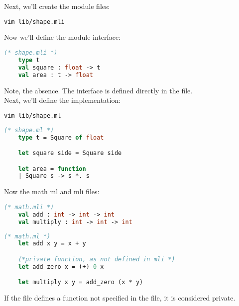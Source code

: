 \newpage 

\begin{Example}

  Next, we'll create the module files:
  \begin{lstlisting}[language=OCaml, numbers=none]
    vim lib/shape.mli 
  \end{lstlisting}

  \noindent
  Now we'll define the module interface:
  \begin{lstlisting}[language=OCaml, numbers=none]
    (* shape.mli *)
    type t
    val square : float -> t
    val area : t -> float
  \end{lstlisting}
  \noindent 
  Note, the  absence. The interface is defined directly in the  file.\\

  \noindent
  Next, we'll define the implementation:
  \begin{lstlisting}[language=OCaml, numbers=none]
    vim lib/shape.ml
  \end{lstlisting}
  \begin{lstlisting}[language=OCaml, numbers=none]
    (* shape.ml *)
    type t = Square of float

    let square side = Square side

    let area = function
    | Square s -> s *. s
  \end{lstlisting}

  \noindent
  Now the math ml and mli files:
  \begin{lstlisting}[language=OCaml, numbers=none]
    (* math.mli *)
    val add : int -> int -> int
    val multiply : int -> int -> int
  \end{lstlisting}
  \begin{lstlisting}[language=OCaml, numbers=none]
    (* math.ml *)
    let add x y = x + y

    (*private function, as not defined in mli *)
    let add_zero x = (+) 0 x

    let multiply x y = add_zero (x * y)
  \end{lstlisting}
\end{Example}

\begin{Def}

  If the  file defines a function not specified in the  file, it is considered private.
\end{Def}
\newpage 

